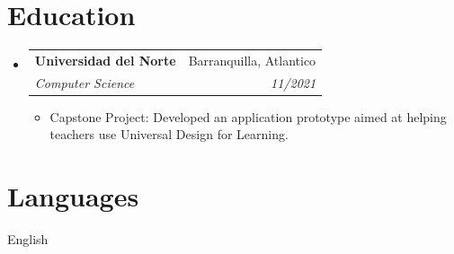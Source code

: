 \documentclass[letterpaper,11pt]{article}
\makeatletter
\newcommand{\resumeItem}[1]{
  \item\small{
    {#1 \vspace{-2pt}}
  }
}
\newcommand{\resumeSubheading}[4]{
  \vspace{6pt}\item
    \begin{tabular*}{0.97\textwidth}[t]{l@{\extracolsep{\fill}}r}
      \textbf{#1} & #4 \\
      \textit{\small#3} & \textit{\small #2} \\
    \end{tabular*}\vspace{-5pt}
}
\newcommand{\resumeSubHeadingListStart}{\begin{itemize}[leftmargin=0.15in, label={}]}
\newcommand{\resumeSubHeadingListEnd}{\end{itemize}}
\newcommand{\resumeItemListStart}{\begin{itemize}}
\newcommand{\resumeItemListEnd}{\end{itemize}\vspace{-5pt}}
\makeatother
\begin{document}
\section{Education}
  \resumeSubHeadingListStart
    \resumeSubheading
      {Universidad del Norte}{11/2021}
      {Computer Science}{Barranquilla, Atlantico}
      \resumeItemListStart
        \resumeItem{Capstone Project: Developed an application prototype aimed at helping teachers use Universal Design for Learning.}
      \resumeItemListEnd
  \resumeSubHeadingListEnd






\section{Languages}
 \begin{itemize}[leftmargin=0.15in, label={}]
    \small{\item{English}}
 \end{itemize}


\end{document}
